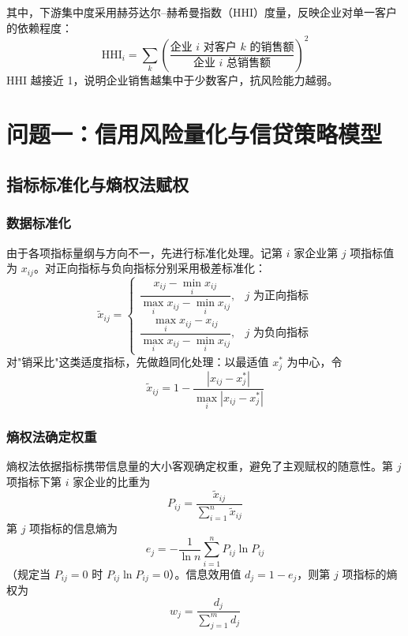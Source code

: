 \documentclass[12pt]{ctexart}
\begin{document}
其中，下游集中度采用赫芬达尔--赫希曼指数（HHI）度量，反映企业对单一客户的依赖程度：
\begin{equation}
\mathrm{HHI}_i = \sum_{k}\left(\frac{\text{企业 }i\text{ 对客户 }k\text{ 的销售额}}{\text{企业 }i\text{ 总销售额}}\right)^{2}
\end{equation}
HHI 越接近 1，说明企业销售越集中于少数客户，抗风险能力越弱。

\section{问题一：信用风险量化与信贷策略模型}

\subsection{指标标准化与熵权法赋权}

\subsubsection{数据标准化}

由于各项指标量纲与方向不一，先进行标准化处理。记第 $i$ 家企业第 $j$ 项指标值为 $x_{ij}$。对正向指标与负向指标分别采用极差标准化：
\begin{equation}
\tilde{x}_{ij} =
\begin{cases}
\dfrac{x_{ij}-\min_i x_{ij}}{\max_i x_{ij}-\min_i x_{ij}}, & \text{$j$ 为正向指标}\\[8pt]
\dfrac{\max_i x_{ij}-x_{ij}}{\max_i x_{ij}-\min_i x_{ij}}, & \text{$j$ 为负向指标}
\end{cases}
\end{equation}
对"销采比"这类适度指标，先做趋同化处理：以最适值 $x_j^{*}$ 为中心，令
\begin{equation}
\tilde{x}_{ij} = 1 - \frac{|x_{ij}-x_j^{*}|}{\max_i|x_{ij}-x_j^{*}|}
\end{equation}

\subsubsection{熵权法确定权重}

熵权法依据指标携带信息量的大小客观确定权重，避免了主观赋权的随意性。第 $j$ 项指标下第 $i$ 家企业的比重为
\begin{equation}
P_{ij} = \frac{\tilde{x}_{ij}}{\sum_{i=1}^{n}\tilde{x}_{ij}}
\end{equation}
第 $j$ 项指标的信息熵为
\begin{equation}
e_j = -\frac{1}{\ln n}\sum_{i=1}^{n} P_{ij}\ln P_{ij}
\end{equation}
（规定当 $P_{ij}=0$ 时 $P_{ij}\ln P_{ij}=0$）。信息效用值 $d_j = 1-e_j$，则第 $j$ 项指标的熵权为
\begin{equation}
w_j = \frac{d_j}{\sum_{j=1}^{m} d_j}
\end{equation}
\end{document}
